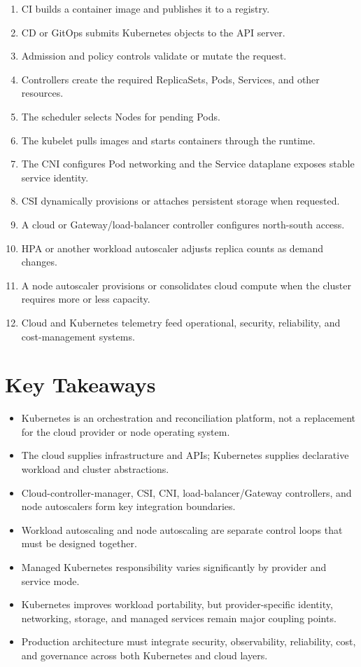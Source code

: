 \documentclass[11pt]{article}
\begin{document}
\begin{enumerate}
  \item CI builds a container image and publishes it to a registry.
  \item CD or GitOps submits Kubernetes objects to the API server.
  \item Admission and policy controls validate or mutate the request.
  \item Controllers create the required ReplicaSets, Pods, Services, and other resources.
  \item The scheduler selects Nodes for pending Pods.
  \item The kubelet pulls images and starts containers through the runtime.
  \item The CNI configures Pod networking and the Service dataplane exposes stable service identity.
  \item CSI dynamically provisions or attaches persistent storage when requested.
  \item A cloud or Gateway/load-balancer controller configures north-south access.
  \item HPA or another workload autoscaler adjusts replica counts as demand changes.
  \item A node autoscaler provisions or consolidates cloud compute when the cluster requires more or less capacity.
  \item Cloud and Kubernetes telemetry feed operational, security, reliability, and cost-management systems.
\end{enumerate}

\section{Key Takeaways}

\begin{keyidea}[Summary]
\begin{itemize}
  \item Kubernetes is an orchestration and reconciliation platform, not a replacement for the cloud provider or node operating system.
  \item The cloud supplies infrastructure and APIs; Kubernetes supplies declarative workload and cluster abstractions.
  \item Cloud-controller-manager, CSI, CNI, load-balancer/Gateway controllers, and node autoscalers form key integration boundaries.
  \item Workload autoscaling and node autoscaling are separate control loops that must be designed together.
  \item Managed Kubernetes responsibility varies significantly by provider and service mode.
  \item Kubernetes improves workload portability, but provider-specific identity, networking, storage, and managed services remain major coupling points.
  \item Production architecture must integrate security, observability, reliability, cost, and governance across both Kubernetes and cloud layers.
\end{itemize}
\end{keyidea}
\end{document}
